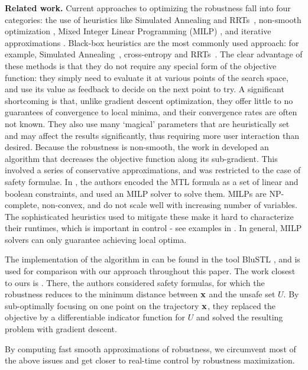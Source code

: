 \textbf{Related work.}
Current approaches to optimizing the robustness fall into four categories: 
the use of heuristics like Simulated Annealing and RRTs~\cite{NghiemSFIGP10hscc,AbbasF_HybridSA12,SankaranarayananF2012hscc,Dreossi15_RRTFalsification,Deshmukh15_IterativeApproaches}, 
non-smooth optimization \cite{AbbasF13acc}, 
Mixed Integer Linear Programming (MILP) \cite{Raman14_MPCSTL}, 
and iterative approximations \cite{AbbasATVA11_LinFalsification,Abbas14_MTLDescent}.
Black-box heuristics are the most commonly used approach: for example, Simulated Annealing~\cite{NghiemSFIGP10hscc}, cross-entropy \cite{SankaranarayananF2012hscc} and RRTs~\cite{Dreossi15_RRTFalsification}.
The clear advantage of these methods is that they do not require any special form of the objective function: they simply need to evaluate it at various points of the search space, and use its value as feedback to decide on the next point to try.
A significant shortcoming is that, unlike gradient descent optimization, they offer little to no guarantees of convergence to local minima, and their convergence rates are often not known. 
They also use many `magical' parameters that are heuristically set and may affect the results significantly, thus requiring more user interaction than desired.
Because the robustness is non-smooth, the work in \cite{AbbasF13acc} developed an algorithm that decreases the objective function along its sub-gradient. 
This involved a series of conservative approximations, and was restricted to the case of safety formulae.
In \cite{Raman14_MPCSTL}, the authors encoded the MTL formula as a set of linear and boolean constraints, and used an MILP solver to solve them.
MILPs are NP-complete, non-convex, and do not scale well with increasing number of variables. The sophisticated heuristics used to mitigate these make it hard to characterize their runtimes, which is important in control - see examples in \cite{Raman14_MPCSTL}. In general, MILP solvers can only guarantee achieving local optima.

The implementation of the algorithm in \cite{Raman14_MPCSTL} can be found in the tool BluSTL \cite{}, and is used for comparison with our approach throughout this paper.
The work closest to ours is \cite{AbbasATVA11_LinFalsification,Abbas14_MTLDescent}.
There, the authors considered safety formulas, for which the robustness reduces to the minimum distance between $\mathbf{x}$ and the unsafe set $U$.
By sub-optimally focusing on one point on the trajectory $\mathbf{x}$, they replaced the objective by a differentiable indicator function for $U$ and solved the resulting problem with gradient descent.

By computing fast smooth approximations of robustness, we circumvent most of the above issues and get closer to real-time control by robustness maximization.




